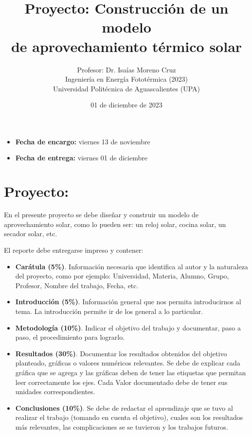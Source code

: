 \documentclass[spanish, letterpaper,12]{article}
\begin{document}
 
 
\title{Proyecto: Construcción de un modelo\\
  de aprovechamiento térmico solar}
\author{Profesor: Dr. Isaías Moreno Cruz\\
  Ingeniería en Energía Fototérmica (2023)\\
Universidad Politécnica de Aguascalientes (UPA)}
\date{01 de diciembre de 2023}

\maketitle

\begin{itemize}[leftmargin=*, noitemsep]
\item \textbf{Fecha de encargo:} viernes 13 de noviembre
\item \textbf{Fecha de entrega:} viernes 01 de diciembre
\end{itemize}
\thispagestyle{fancy}

\section*{Proyecto:}

En el presente proyecto se debe diseñar y construir un modelo de aprovechamiento solar, como lo pueden ser: un reloj solar, cocina solar, un secador solar, etc. 


El reporte debe entregarse impreso y contener:
\begin{itemize}
\item \textbf{Carátula (5\%)}. Información necesaria que identifica al autor y la naturaleza del proyecto, como por ejemplo: Universidad, Materia, Alumno, Grupo, Profesor, Nombre del trabajo, Fecha, etc.
\item \textbf{Introducción (5\%)}. Información general que nos permita introducirnos al tema. La introducción permite ir de los general a lo particular.
\item \textbf{Metodología (10\%)}. Indicar el objetivo del trabajo y documentar, paso a paso, el procedimiento para lograrlo.   
\item \textbf{Resultados (30\%)}. Documentar los resultados obtenidos del objetivo planteado, gráficas o valores numéricos relevantes. Se debe de explicar cada gráfica que se agrega y las gráficas deben de tener las etiquetas que permitan leer correctamente los ejes. Cada Valor documentado debe de tener sus unidades correspondientes.
\item \textbf{Conclusiones (10\%)}. Se debe de redactar el aprendizaje que se tuvo al realizar el trabajo (tomando en cuenta el objetivo), cuales son los resultados más relevantes, las complicaciones se se tuvieron y los trabajos futuros.
\end{itemize}
\end{document}
